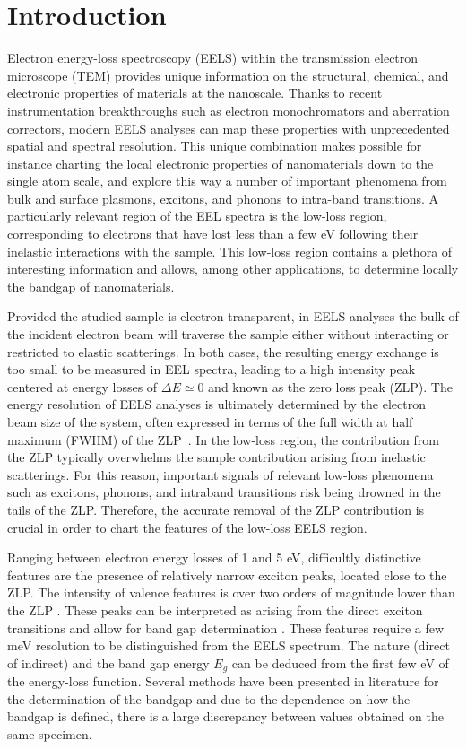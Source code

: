 
\section{Introduction}
\label{sec:introduction}

Electron energy-loss spectroscopy (EELS) within the transmission electron microscope (TEM) provides unique information on the structural, chemical, and electronic properties of materials at the nanoscale.
%
Thanks to recent instrumentation breakthroughs
such as electron monochromators and aberration correctors,
modern EELS analyses can map these properties with unprecedented spatial and spectral resolution.
%
This unique combination makes possible for instance charting the local
electronic properties of nanomaterials
down to the single atom scale, and explore this way a number of
important phenomena
from bulk and surface plasmons, excitons,
and phonons to intra-band transitions.
%
A particularly relevant region of the EEL spectra is
the low-loss region, corresponding to electrons that have lost
less than a few eV following their inelastic interactions
with the sample.
%
This low-loss region contains a plethora of interesting
information and allows, among other applications,
to determine locally the bandgap of nanomaterials.

Provided the studied sample is electron-transparent,
in EELS analyses
the bulk of the incident electron beam will traverse the sample
either without interacting or restricted to elastic scatterings.
%
In both cases, the resulting energy exchange is too small
to be measured in EEL spectra, leading to a 
 high intensity peak centered at energy losses
of $\Delta E\simeq 0$ and known as the zero loss peak (ZLP).
%
The energy resolution of EELS analyses is ultimately determined by
the electron beam size of the system, often expressed in terms
of the full width at half maximum (FWHM) of the
ZLP~\cite{Egerton:2009}.
%
In the low-loss region, the contribution from the ZLP
typically overwhelms the sample contribution arising
from inelastic scatterings.
%
For this reason, important signals of relevant low-loss phenomena such as excitons, phonons, and intraband transitions risk being drowned
in the tails of the ZLP.
%
Therefore, the accurate removal of the ZLP
contribution is crucial  in order to  chart the  features
of the low-loss EELS region. 

 Ranging between electron energy losses of 1 and 5 eV, difficultly distinctive features are the presence of relatively narrow exciton peaks, located close to the ZLP. The intensity of valence features is over two orders of magnitude lower than the ZLP \cite{Abajo:2010}. These peaks can be interpreted as arising from the direct exciton transitions and allow for band gap determination \cite{Stoger:2008}. These features require a few meV resolution to be distinguished from the EELS spectrum. The nature (direct of indirect) and the band gap energy $E_g$ can be deduced from the first few eV of the energy-loss function. Several methods have been presented in literature for the determination of the bandgap and due to the dependence on how the bandgap is defined, there is a large discrepancy between values obtained on the same specimen.

